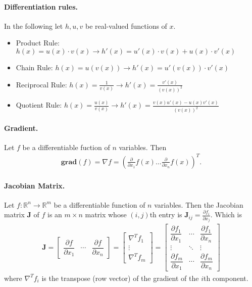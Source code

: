 \documentclass{article}
\begin{document}
\paragraph{Differentiation rules.} In the following let $h, u, v$ be real-valued functions of $x$.
\begin{itemize}
    \item Product Rule: $h(x) = u(x) \cdot v(x) \rightarrow h'(x) = u'(x) \cdot v(x) + u(x) \cdot v'(x)$
    \item Chain Rule: $h(x) = u(v(x)) \rightarrow  h'(x) = u'(v(x)) \cdot v'(x)$
    \item Reciprocal Rule: $h(x) = \frac{1}{v(x)} \rightarrow  h'(x) = \frac{v'(x)}{(v(x))^2}$
    \item Quotient Rule: $h(x) = \frac{u(x)}{v(x)} \rightarrow  h'(x) = \frac{v(x)u'(x) - u(x)v'(x)}{(v(x))^2}$
\end{itemize}

\paragraph{Gradient.} Let $f$ be a differentiable fuction of $n$ variables. Then
\begin{gather*}
    \mathbf{grad}(f) = \nabla f = \left( \frac{\partial}{\partial x_1} f(x) \dots \frac{\partial}{\partial x_n} f(x) \right)^T.
\end{gather*}

\paragraph{Jacobian Matrix.} Let $f: \mathbb{R}^{n} \rightarrow \mathbb{R}^{m}$ be a differentiable function of $n$ variables. Then the Jacobian matrix $\mathbf {J}$ of $f$ is an $m \times n$ matrix whose $(i,j)$th entry is ${\mathbf {J}_{ij}={\frac {\partial f_{i}}{\partial x_{j}}}}$. Which is 
\begin{gather*}
    {\mathbf {J} ={\begin{bmatrix}{\dfrac {\partial f }{\partial x_{1}}}&\cdots &{\dfrac {\partial f }{\partial x_{n}}}\end{bmatrix}}={\begin{bmatrix}\nabla ^{T}f_{1}\\\vdots \\\nabla ^{T}f_{m}\end{bmatrix}}={\begin{bmatrix}{\dfrac {\partial f_{1}}{\partial x_{1}}}&\cdots &{\dfrac {\partial f_{1}}{\partial x_{n}}}\\\vdots &\ddots &\vdots \\{\dfrac {\partial f_{m}}{\partial x_{1}}}&\cdots &{\dfrac {\partial f_{m}}{\partial x_{n}}}\end{bmatrix}}}
\end{gather*}
where ${\nabla ^{T}f_{i}}$ is the transpose (row vector) of the gradient of the $i$th component.
\end{document}
